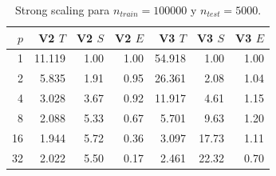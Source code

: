 \begin{table}[H]
\centering
\begin{tabular}{rrrrrrr}
\toprule
$p$ & V2 $T$ & V2 $S$ & V2 $E$ & V3 $T$ & V3 $S$ & V3 $E$ \\
\midrule
1 & 11.119 & 1.00 & 1.00 & 54.918 & 1.00 & 1.00 \\
2 & 5.835 & 1.91 & 0.95 & 26.361 & 2.08 & 1.04 \\
4 & 3.028 & 3.67 & 0.92 & 11.917 & 4.61 & 1.15 \\
8 & 2.088 & 5.33 & 0.67 & 5.701 & 9.63 & 1.20 \\
16 & 1.944 & 5.72 & 0.36 & 3.097 & 17.73 & 1.11 \\
32 & 2.022 & 5.50 & 0.17 & 2.461 & 22.32 & 0.70 \\
\bottomrule
\end{tabular}
\caption{Strong scaling para $n_{train}=100000$ y $n_{test}=5000$.}
\label{tab:strong-100k}
\end{table}
